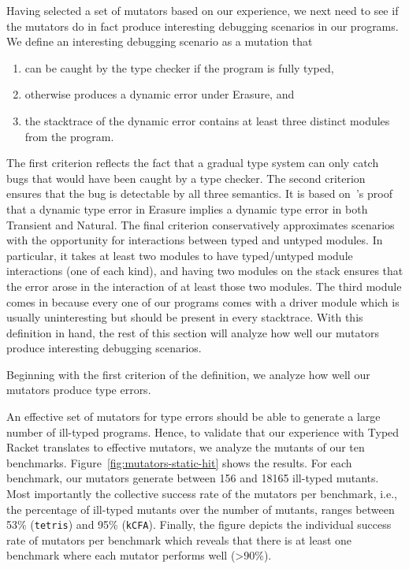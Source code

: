 Having selected a set of mutators based on our experience, we next need to see if the mutators do in fact produce interesting debugging scenarios in our programs.
We define an interesting debugging scenario as a mutation that
\begin{enumerate}
\item can be caught by the type checker if the program is fully typed,
\item otherwise produces a dynamic error under Erasure, and
\item the stacktrace of the dynamic error contains at least three distinct modules from the program.
\end{enumerate}
The first criterion reflects the fact that a gradual type system can only catch bugs that would have been caught by a type checker.
The second criterion ensures that the bug is detectable by all three semantics.
It is based on~\citet{gfd-oopsla-2019}'s proof that a dynamic type error in Erasure implies a dynamic type error in both Transient and Natural.
The final criterion conservatively approximates scenarios with the opportunity for interactions between typed and untyped modules. %
In particular, it takes at least two modules to have typed/untyped module interactions (one of each kind), and having two modules on the stack ensures that the error arose in the interaction of at least those two modules.
The third module comes in because every one of our programs comes with a driver module which is usually uninteresting but should be present in every stacktrace.
With this definition in hand, the rest of this section will analyze how well our mutators produce interesting debugging scenarios.

Beginning with the first criterion of the definition, we analyze how well our mutators produce type errors.



An effective set of mutators for type errors should be able to generate
a large number of ill-typed programs. Hence, to validate that our experience
with Typed Racket translates to effective mutators, we analyze the
 mutants of our ten benchmarks. Figure~\ref{fig:mutators-static-hit} shows
 the results. For each benchmark, our mutators generate between 156 and
 18165 ill-typed mutants. Most importantly the collective success rate of
 the mutators  per benchmark, i.e., the percentage of ill-typed mutants
 over the number of mutants, ranges between 53\% (\texttt{tetris})
 and 95\% (\texttt{kCFA}). Finally, the figure depicts the individual success rate
 of mutators per benchmark which reveals that there is at
 least one benchmark where each mutator performs well
 (>90\%).

